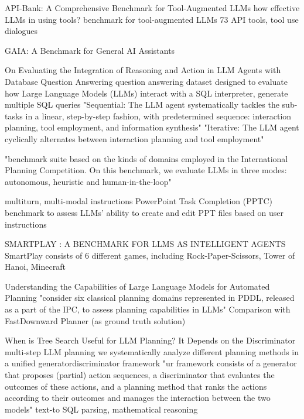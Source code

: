 \documentclass{article}
\begin{document}
\cite{li_api-bank_2023} API-Bank: A Comprehensive Benchmark for Tool-Augmented LLMs
how effective LLMs in using tools?
benchmark for tool-augmented LLMs
73 API tools, tool use dialogues

\cite{mialon_gaia_2023} GAIA: A Benchmark for General AI Assistants

\cite{nan_evaluating_2023} On Evaluating the Integration of Reasoning and Action in LLM Agents with Database Question Answering
question answering dataset designed to evaluate how Large Language Models (LLMs) interact with a SQL interpreter, generate multiple SQL queries
"Sequential: The LLM agent systematically tackles the sub-tasks in a linear, step-by-step fashion, with predetermined sequence: interaction planning, tool employment, and information synthesis"
"Iterative: The LLM agent cyclically alternates between interaction planning and tool employment"

\cite{valmeekam_planning_2023}
"benchmark suite based on the kinds of domains employed in the International Planning Competition. On this benchmark, we evaluate LLMs in three modes: autonomous, heuristic and human-in-the-loop"

\cite{guo_pptc_2023}
multiturn, multi-modal instructions
PowerPoint Task Completion (PPTC) benchmark to assess LLMs’ ability to create and edit PPT files based on user instructions

\cite{wu_smartplay_2023} SMARTPLAY : A BENCHMARK FOR LLMS AS INTELLIGENT AGENTS
SmartPlay consists of 6 different games, including Rock-Paper-Scissors, Tower of Hanoi, Minecraft

\cite{pallagani_understanding_2023} Understanding the Capabilities of Large Language Models for Automated Planning
"consider six classical planning domains represented in PDDL, released as a part of the IPC, to assess planning capabilities in LLMs"
Comparison with FastDownward Planner (as ground truth solution)

\cite{chen_when_2024} When is Tree Search Useful for LLM Planning? It Depends on the Discriminator
multi-step LLM planning
we systematically analyze different planning methods in a unified generatordiscriminator framework
"ur framework consists of a generator that proposes (partial) action sequences, a discriminator that evaluates the outcomes of these actions, and a planning method that ranks the actions according to their outcomes and manages the interaction between the two models"
text-to SQL parsing, mathematical reasoning
\end{document}
